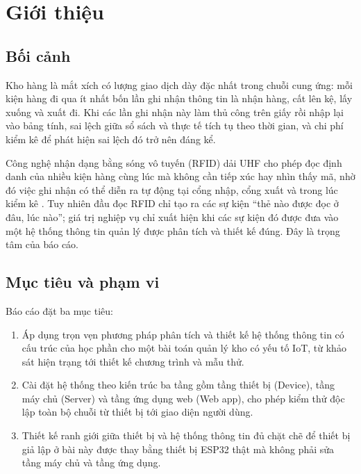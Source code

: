 \chapter{Giới thiệu}
\label{ch:gioithieu}

\section{Bối cảnh}

Kho hàng là mắt xích có lượng giao dịch dày đặc nhất trong chuỗi cung ứng: mỗi kiện hàng đi qua ít nhất bốn lần ghi nhận thông tin là nhận hàng, cất lên kệ, lấy xuống và xuất đi. Khi các lần ghi nhận này làm thủ công trên giấy rồi nhập lại vào bảng tính, sai lệch giữa sổ sách và thực tế tích tụ theo thời gian, và chi phí kiểm kê để phát hiện sai lệch đó trở nên đáng kể.

Công nghệ nhận dạng bằng sóng vô tuyến (RFID) dải UHF cho phép đọc định danh của nhiều kiện hàng cùng lúc mà không cần tiếp xúc hay nhìn thấy mã, nhờ đó việc ghi nhận có thể diễn ra tự động tại cổng nhập, cổng xuất và trong lúc kiểm kê \cite{epcgen2}. Tuy nhiên đầu đọc RFID chỉ tạo ra các sự kiện “thẻ nào được đọc ở đâu, lúc nào”; giá trị nghiệp vụ chỉ xuất hiện khi các sự kiện đó được đưa vào một hệ thống thông tin quản lý được phân tích và thiết kế đúng. Đây là trọng tâm của báo cáo.

\section{Mục tiêu và phạm vi}

Báo cáo đặt ba mục tiêu:
\begin{enumerate}
  \item Áp dụng trọn vẹn phương pháp phân tích và thiết kế hệ thống thông tin có cấu trúc của học phần \cite{tung_qlhttt} cho một bài toán quản lý kho có yếu tố IoT, từ khảo sát hiện trạng tới thiết kế chương trình và mẫu thử.
  \item Cài đặt hệ thống theo kiến trúc ba tầng gồm tầng thiết bị (Device), tầng máy chủ (Server) và tầng ứng dụng web (Web app), cho phép kiểm thử độc lập toàn bộ chuỗi từ thiết bị tới giao diện người dùng.
  \item Thiết kế ranh giới giữa thiết bị và hệ thống thông tin đủ chặt chẽ để thiết bị giả lập ở bài này được thay bằng thiết bị ESP32 thật mà không phải sửa tầng máy chủ và tầng ứng dụng.
\end{enumerate}


